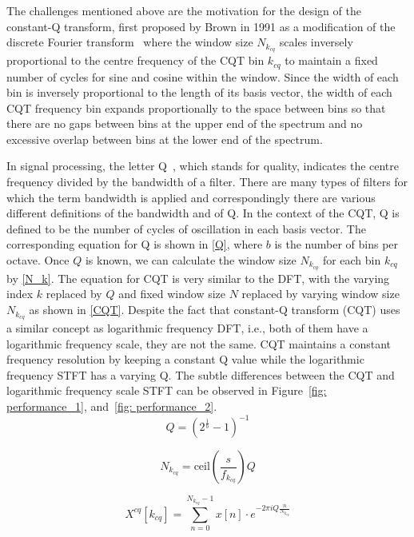 \documentclass{ieeeaccess}
\begin{document}
The challenges mentioned above are the motivation for the design of the constant-Q transform, first proposed by Brown in 1991 as a modification of the discrete Fourier transform~\cite{brown1991calculation} where the window size $N_{k_{cq}}$ scales inversely proportional to the centre frequency of the CQT bin $k_{cq}$ to maintain a fixed number of cycles for sine and cosine within the window. Since the width of each bin is inversely proportional to the length of its basis vector, the width of each CQT frequency bin expands proportionally to the space between bins so that there are no gaps between bins at the upper end of the spectrum and no excessive overlap between bins at the lower end of the spectrum.


In signal processing, the letter Q~\cite{q-factor}, which stands for quality, indicates the centre frequency divided by the bandwidth of a filter. There are many types of filters for which the term bandwidth is applied and correspondingly there are various different definitions of the bandwidth and of Q. In the context of the CQT, Q is defined to be the number of cycles of oscillation in each basis vector. The corresponding equation for Q is shown in \eqref{Q}, where $b$ is the number of bins per octave. Once $Q$ is known, we can calculate the window size $N_{k_{cq}}$ for each bin $k_{cq}$ by \eqref{N_k}. The equation for CQT is very similar to the DFT, with the varying index $k$ replaced by $Q$ and fixed window size $N$ replaced by varying window size $N_{k_{cq}}$ as shown in \eqref{CQT}. Despite the fact that constant-Q transform (CQT) uses a  similar concept as logarithmic frequency DFT, i.e., both of them have a logarithmic frequency scale, they are not the same. CQT maintains a constant frequency resolution by keeping a constant Q value while the logarithmic frequency STFT has a varying Q. The subtle differences between the CQT and logarithmic frequency scale STFT can be observed in Figure~\ref{fig: performance_1}, and~\ref{fig: performance_2}.
\begin{equation}
    Q=(2^{\frac{1}{b}}-1)^{-1}
    \label{Q}
\end{equation}

\begin{equation}
    N_{k_{cq}}=   \text{ceil}{\left(\frac{s}{f_{k_{cq}}}\right)Q}
    \label{N_k}
\end{equation}

\begin{equation}
    X^{cq}[k_{cq}]= \sum_{n=0}^{N_{k_{cq}}-1}x[n]\cdot e^{-2\pi i Q \frac{n}{N_{k_{cq}}}}
    \label{CQT}
\end{equation}
\end{document}
